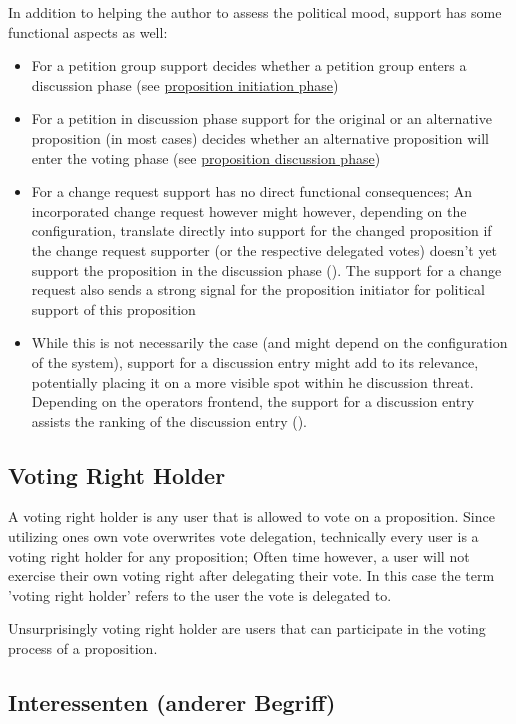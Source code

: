 In addition to helping the author to assess the political mood, support has some functional aspects as well:
\begin{itemize}
\item For a petition group support decides whether a petition group enters a discussion phase (see \hyperref[ssec:Lifecycle_Initiation]{proposition initiation phase})
\item For a petition in discussion phase support for the original or an alternative proposition (in most cases) decides whether an alternative proposition will enter the voting phase (see \hyperref[ssec:Lifecycle_Discussion]{proposition discussion phase})
\item For a change request support has no direct functional consequences; An incorporated change request however might however, depending on the configuration, translate directly into support for the changed proposition if the change request supporter (or the respective delegated votes) doesn't yet support the proposition in the discussion phase (). The support for a change request also sends a strong signal for the proposition initiator for political support of this proposition
\item While this is not necessarily the case (and might depend on the configuration of the system), support for a discussion entry might add to its relevance, potentially placing it on a more visible spot within he discussion threat. Depending on the operators frontend, the support for a discussion entry assists the ranking of the discussion entry ().
\end{itemize}


\subsection{Voting Right Holder}
\label{ssec:Roles_VotingRightHolder}
A voting right holder is any user that is allowed to vote on a proposition. Since utilizing ones own vote overwrites vote delegation, technically every user is a voting right holder for any proposition; Often time however, a user will not exercise their own voting right after delegating their vote. In this case the term 'voting right holder' refers to the user the vote is delegated to. 

Unsurprisingly voting right holder are users that can participate in the voting process of a proposition.


\subsection{Interessenten (anderer Begriff)}
% 
% 
% 
\label{ssec:Roles_Interessenten}

